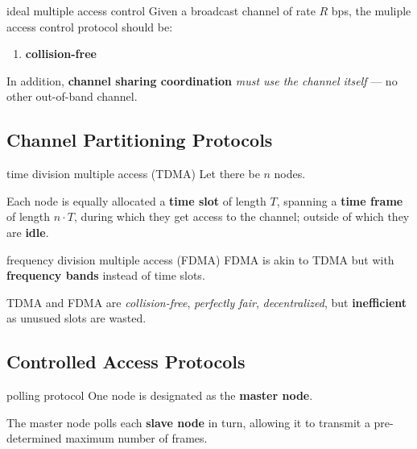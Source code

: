 \begin{defn}{ideal multiple access control}
    Given a broadcast channel of rate $R$ bps, the muliple access control protocol should be:
    \begin{enumerate}
        \item \textbf{collision-free}
    \end{enumerate}

    In addition, \textbf{channel sharing coordination} \textit{must use the channel itself}
    --- no other out-of-band channel.
\end{defn}

\subsection{Channel Partitioning Protocols}

\begin{defn}{time division multiple access (TDMA)}
    Let there be $n$ nodes.

    Each node is equally allocated a \textbf{time slot} of length $T$,
    spanning a \textbf{time frame} of length $n \cdot T$, during which they get access
    to the channel; outside of which they are \textbf{idle}.
\end{defn}

\begin{defn}{frequency division multiple access (FDMA)}
    FDMA is akin to TDMA but with \textbf{frequency bands} instead of time slots.
\end{defn}

TDMA and FDMA are \textit{collision-free}, \textit{perfectly fair}, \textit{decentralized},
but \textbf{inefficient} as unusued slots are wasted.

\subsection{Controlled Access Protocols}

\begin{defn}{polling protocol}
    One node is designated as the \textbf{master node}.

    The master node polls each \textbf{slave node} in turn, allowing it to transmit
    a pre-determined maximum number of frames.
\end{defn}

